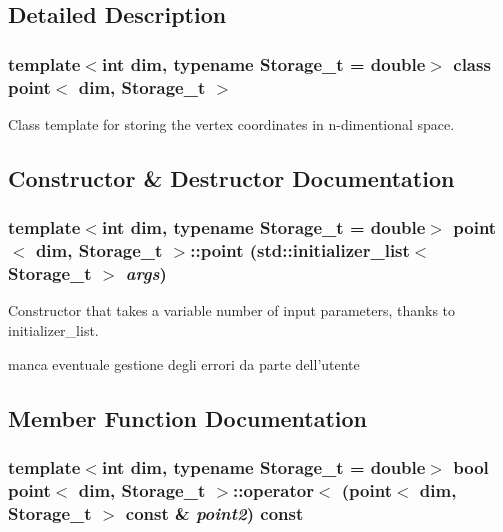 \subsection{Detailed Description}
\subsubsection*{template$<$int dim, typename Storage\_\-t = double$>$ class point$<$ dim, Storage\_\-t $>$}

Class template for storing the vertex coordinates in n-\/dimentional space. 

\subsection{Constructor \& Destructor Documentation}
\hypertarget{classpoint_a0fb87b56e4911071c175143175d8750e}{
\subsubsection[{point}]{\setlength{\rightskip}{0pt plus 5cm}template$<$int dim, typename Storage\_\-t = double$>$ {\bf point}$<$ dim, Storage\_\-t $>$::{\bf point} (std::initializer\_\-list$<$ Storage\_\-t $>$ {\em args})}}
\label{classpoint_a0fb87b56e4911071c175143175d8750e}


Constructor that takes a variable number of input parameters, thanks to initializer\_\-list. 

manca eventuale gestione degli errori da parte dell'utente 

\subsection{Member Function Documentation}
\hypertarget{classpoint_a0debd4bc2cf38b82fd14ebe15f142a9c}{
\subsubsection[{operator$<$}]{\setlength{\rightskip}{0pt plus 5cm}template$<$int dim, typename Storage\_\-t = double$>$ bool {\bf point}$<$ dim, Storage\_\-t $>$::operator$<$ ({\bf point}$<$ dim, Storage\_\-t $>$ const \& {\em point2}) const}}
\label{classpoint_a0debd4bc2cf38b82fd14ebe15f142a9c}


